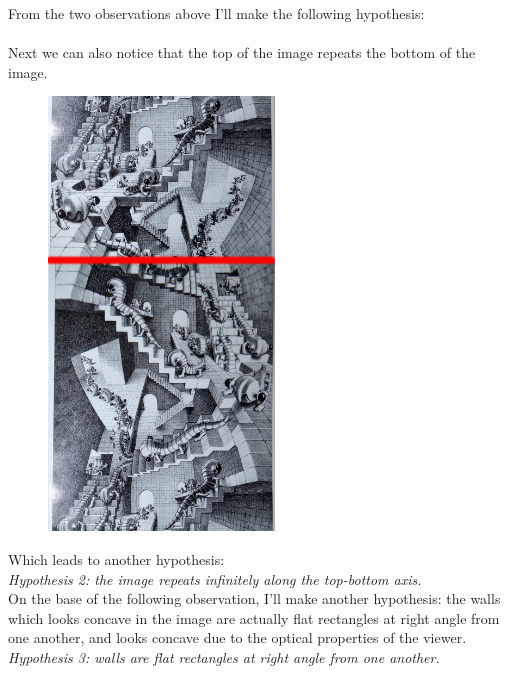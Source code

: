 \documentclass[12pt, a4paper]{article}
\begin{document}
From the two observations above I'll make the following hypothesis:\\

\\

Next we can also notice that the top of the image repeats the bottom of the image.\\

\begin{center}
\begin{figure}[H]
\centering\includegraphics[width=6cm]{./mirror3.png}\\
\end{figure}
\end{center}

Which leads to another hypothesis:\\

\emph{Hypothesis 2: the image repeats infinitely along the top-bottom axis.}\\

On the base of the following observation, I'll make another hypothesis: the walls which looks concave in the image are actually flat rectangles at right angle from one another, and looks concave due to the optical properties of the viewer.\\

\emph{Hypothesis 3: walls are flat rectangles at right angle from one another.}\\
\end{document}
